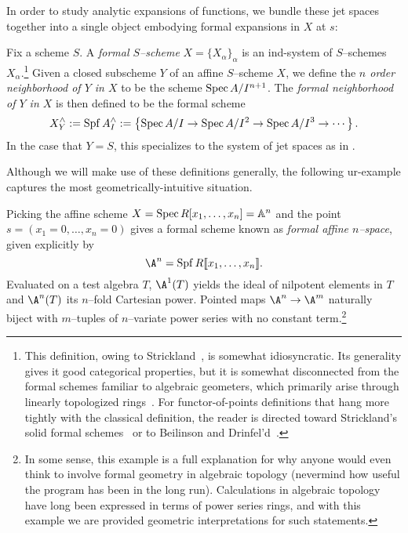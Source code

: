 In order to study analytic expansions of functions, we bundle these jet spaces together into a single object embodying formal expansions in \(X\) at \(s\):
\begin{definition}\label{DefnCompletion}
Fix a scheme \(S\).  A \textit{formal \(S\)--scheme} \(X = \{X_\alpha\}_\alpha\) is an ind-system of \(S\)--schemes \(X_\alpha\).\footnote{This definition, owing to Strickland~\cite[Definition 4.1]{StricklandFSFG}, is somewhat idiosyncratic.  Its generality gives it good categorical properties, but it is somewhat disconnected from the formal schemes familiar to algebraic geometers, which primarily arise through linearly topologized rings~\cite[pg.\ 194]{Hartshorne}.  For functor-of-points definitions that hang more tightly with the classical definition, the reader is directed toward Strickland's solid formal schemes~\cite[Definition 4.16]{StricklandFSFG} or to Beilinson and Drinfel'd~\cite[Section 7.11.1]{BeilinsonDrinfeld}.}  Given a closed subscheme \(Y\) of an affine \(S\)--scheme \(X\), we define the \textit{\(n\){\th} order neighborhood of \(Y\) in \(X\)} to be the scheme \(\operatorname{Spec} A/I^{n+1}\).  The \textit{formal neighborhood of \(Y\) in \(X\)} is then defined to be the formal scheme \[X^\wedge_Y := \operatorname{Spf} A^\wedge_I := \left\{ \operatorname{Spec} A/I \to \operatorname{Spec} A/I^2 \to \operatorname{Spec} A/I^3 \to \cdots \right\}.\]  In the case that \(Y = S\), this specializes to the system of jet spaces as in .
\end{definition}

Although we will make use of these definitions generally, the following ur-example captures the most geometrically-intuitive situation.

\begin{example}\label{MapsOfFVarsArePowerSeries}
Picking the affine scheme \(X = \operatorname{Spec} R[x_1, \ldots, x_n] = \mathbb A^n\) and the point \(s = (x_1 = 0, \ldots, x_n = 0)\) gives a formal scheme known as \textit{formal affine \(n\)--space}, given explicitly by \[\A^n = \Spf R\llbracket x_1, \ldots, x_n\rrbracket.\]  Evaluated on a test algebra \(T\), \(\A^1(T)\) yields the ideal of nilpotent elements in \(T\) and \(\A^n(T)\) its \(n\)--fold Cartesian power.  Pointed maps \(\A^n \to \A^m\) naturally biject with \(m\)--tuples of \(n\)--variate power series with no constant term.\footnote{In some sense, this example is a full explanation for why anyone would even think to involve formal geometry in algebraic topology (nevermind how useful the program has been in the long run).  Calculations in algebraic topology have long been expressed in terms of power series rings, and with this example we are provided geometric interpretations for such statements.}
\end{example}

